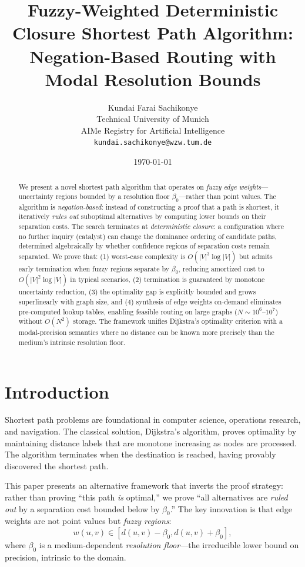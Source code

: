 \documentclass[twocolumn,11pt,a4paper]{article}
\title{Fuzzy-Weighted Deterministic Closure Shortest Path Algorithm:\\
Negation-Based Routing with Modal Resolution Bounds}
\author{%
Kundai Farai Sachikonye\\
\small Technical University of Munich\\
\small AIMe Registry for Artificial Intelligence\\
\small \texttt{kundai.sachikonye@wzw.tum.de}}
\date{\today}
\theoremstyle{definition}
\begin{document}
\maketitle

\begin{abstract}
We present a novel shortest path algorithm that operates on \emph{fuzzy edge weights}---uncertainty regions bounded by a resolution floor $\beta_0$---rather than point values. The algorithm is \emph{negation-based}: instead of constructing a proof that a path is shortest, it iteratively \emph{rules out} suboptimal alternatives by computing lower bounds on their separation costs. The search terminates at \emph{deterministic closure}: a configuration where no further inquiry (catalyst) can change the dominance ordering of candidate paths, determined algebraically by whether confidence regions of separation costs remain separated. We prove that: (1) worst-case complexity is $O(|V|^3 \log |V|)$ but admits early termination when fuzzy regions separate by $\beta_0$, reducing amortized cost to $O(|V|^2 \log |V|)$ in typical scenarios, (2) termination is guaranteed by monotone uncertainty reduction, (3) the optimality gap is explicitly bounded and grows superlinearly with graph size, and (4) synthesis of edge weights on-demand eliminates pre-computed lookup tables, enabling feasible routing on large graphs ($N \sim 10^6$--$10^7$) without $O(N^2)$ storage. The framework unifies Dijkstra's optimality criterion with a modal-precision semantics where no distance can be known more precisely than the medium's intrinsic resolution floor.
\end{abstract}

\section{Introduction}

Shortest path problems are foundational in computer science, operations research, and navigation. The classical solution, Dijkstra's algorithm, proves optimality by maintaining distance labels that are monotone increasing as nodes are processed. The algorithm terminates when the destination is reached, having provably discovered the shortest path.

This paper presents an alternative framework that inverts the proof strategy: rather than proving ``this path \emph{is} optimal,'' we prove ``all alternatives are \emph{ruled out} by a separation cost bounded below by $\beta_0$.'' The key innovation is that edge weights are not point values but \emph{fuzzy regions}:
\begin{equation}
w(u,v) \in [d(u,v) - \beta_0, d(u,v) + \beta_0],
\end{equation}
where $\beta_0$ is a medium-dependent \emph{resolution floor}---the irreducible lower bound on precision, intrinsic to the domain.
\end{document}
